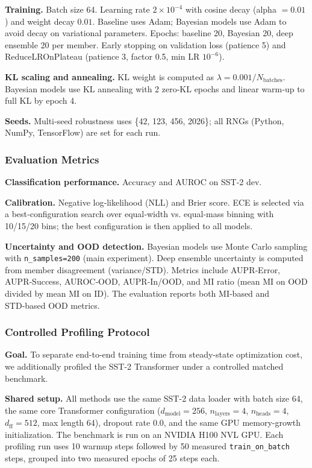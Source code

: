 \documentclass{article}
\theoremstyle{plain}
\theoremstyle{definition}
\theoremstyle{remark}
\begin{document}
\textbf{Training.} Batch size 64. Learning rate $2\times 10^{-4}$ with cosine decay (alpha $=0.01$) and weight decay $0.01$. Baseline uses Adam; Bayesian models use Adam to avoid decay on variational parameters. Epochs: baseline 20, Bayesian 20, deep ensemble 20 per member. Early stopping on validation loss (patience 5) and ReduceLROnPlateau (patience 3, factor 0.5, min LR $10^{-6}$).

\textbf{KL scaling and annealing.} KL weight is computed as $\lambda = 0.001/N_{\text{batches}}$. Bayesian models use KL annealing with 2 zero‑KL epochs and linear warm‑up to full KL by epoch 4.

\textbf{Seeds.} Multi‑seed robustness uses \{42, 123, 456, 2026\}; all RNGs (Python, NumPy, TensorFlow) are set for each run.

\subsubsection{Evaluation Metrics}

\textbf{Classification performance.} Accuracy and AUROC on SST‑2 dev.

\textbf{Calibration.} Negative log‑likelihood (NLL) and Brier score. ECE is selected via a best‑configuration search over equal‑width vs. equal‑mass binning with 10/15/20 bins; the best configuration is then applied to all models.

\textbf{Uncertainty and OOD detection.} Bayesian models use Monte Carlo sampling with \texttt{n\_samples=200} (main experiment). Deep ensemble uncertainty is computed from member disagreement (variance/STD). Metrics include AUPR‑Error, AUPR‑Success, AUROC‑OOD, AUPR‑In/OOD, and MI ratio (mean MI on OOD divided by mean MI on ID). The evaluation reports both MI‑based and STD‑based OOD metrics.
\subsubsection{Controlled Profiling Protocol}
\label{app:exp:sst2:profiling}
\textbf{Goal.} To separate end-to-end training time from steady-state optimization cost, we additionally profiled the SST-2 Transformer under a controlled matched benchmark.

\textbf{Shared setup.} All methods use the same SST-2 data loader with batch size 64, the same core Transformer configuration ($d_{\text{model}}=256$, $n_{\text{layers}}=4$, $n_{\text{heads}}=4$, $d_{\text{ff}}=512$, max length 64), dropout rate 0.0, and the same GPU memory-growth initialization. The benchmark is run on an NVIDIA H100 NVL GPU. Each profiling run uses 10 warmup steps followed by 50 measured \texttt{train\_on\_batch} steps, grouped into two measured epochs of 25 steps each.
\end{document}
